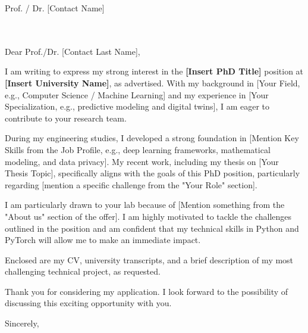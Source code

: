 \documentclass[11pt,a4paper]{letter}
\begin{document}
\begin{letter}{
    Prof. / Dr. [Contact Name] \\
    [University Name] \\
    [Department / Faculty] \\
    [Location]
}

\opening{Dear Prof./Dr. [Contact Last Name],}

I am writing to express my strong interest in the \textbf{[Insert PhD Title]} position at \textbf{[Insert University Name]}, as advertised. With my background in [Your Field, e.g., Computer Science / Machine Learning] and my experience in [Your Specialization, e.g., predictive modeling and digital twins], I am eager to contribute to your research team.

During my engineering studies, I developed a strong foundation in [Mention Key Skills from the Job Profile, e.g., deep learning frameworks, mathematical modeling, and data privacy]. My recent work, including my thesis on [Your Thesis Topic], specifically aligns with the goals of this PhD position, particularly regarding [mention a specific challenge from the "Your Role" section].

I am particularly drawn to your lab because of [Mention something from the "About us" section of the offer]. I am highly motivated to tackle the challenges outlined in the position and am confident that my technical skills in Python and PyTorch will allow me to make an immediate impact.

Enclosed are my CV, university transcripts, and a brief description of my most challenging technical project, as requested. 

Thank you for considering my application. I look forward to the possibility of discussing this exciting opportunity with you.

\closing{Sincerely,}


\end{letter}
\end{document}
